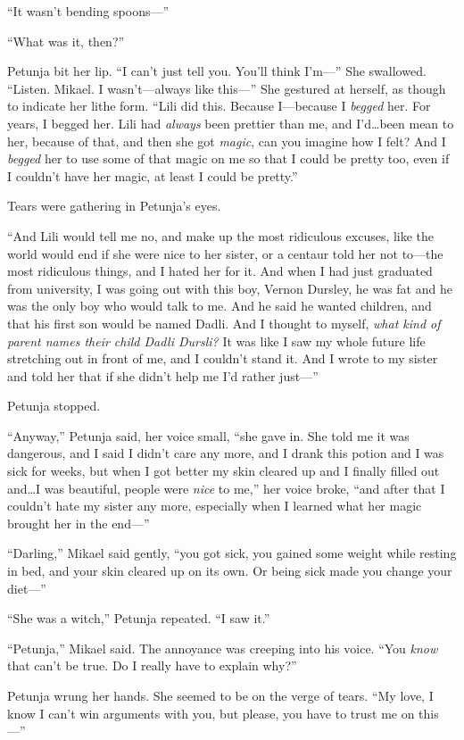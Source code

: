 “It wasn’t bending spoons—”

“What was it, then?”

Petunja bit her lip. “I can’t just tell you. You’ll think I’m—” She swallowed. “Listen. Mikael. I wasn’t—always like this—” She gestured at herself, as though to indicate her lithe form. “Lili did this. Because I—because I \emph{begged} her. For years, I begged her. Lili had \emph{always} been prettier than me, and I’d…been mean to her, because of that, and then she got \emph{magic}, can you imagine how I felt? And I \emph{begged} her to use some of that magic on me so that I could be pretty too, even if I couldn’t have her magic, at least I could be pretty.”

Tears were gathering in Petunja’s eyes.

“And Lili would tell me no, and make up the most ridiculous excuses, like the world would end if she were nice to her sister, or a centaur told her not to—the most ridiculous things, and I hated her for it. And when I had just graduated from university, I was going out with this boy, Vernon Dursley, he was fat and he was the only boy who would talk to me. And he said he wanted children, and that his first son would be named Dadli. And I thought to myself, \emph{what kind of parent names their child Dadli Dursli?} It was like I saw my whole future life stretching out in front of me, and I couldn’t stand it. And I wrote to my sister and told her that if she didn’t help me I’d rather just—”

Petunja stopped.

“Anyway,” Petunja said, her voice small, “she gave in. She told me it was dangerous, and I said I didn’t care any more, and I drank this potion and I was sick for weeks, but when I got better my skin cleared up and I finally filled out and…I was beautiful, people were \emph{nice} to me,” her voice broke, “and after that I couldn’t hate my sister any more, especially when I learned what her magic brought her in the end—”

“Darling,” Mikael said gently, “you got sick, you gained some weight while resting in bed, and your skin cleared up on its own. Or being sick made you change your diet—”

“She was a witch,” Petunja repeated. “I saw it.”

“Petunja,” Mikael said. The annoyance was creeping into his voice. “You \emph{know} that can’t be true. Do I really have to explain why?”

Petunja wrung her hands. She seemed to be on the verge of tears. “My love, I know I can’t win arguments with you, but please, you have to trust me on this—”

